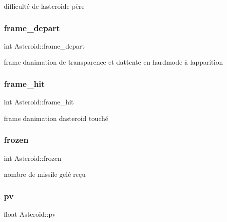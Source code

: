 difficulté de l\textquotesingle{}asteroide père 

\mbox{\label{struct_asteroid_a2162b2408ddf727e63ce810920ae2660}} 
\subsubsection{\texorpdfstring{frame\+\_\+depart}{frame\_depart}}
{\footnotesize\ttfamily int Asteroid\+::frame\+\_\+depart}



frame d\textquotesingle{}animation de transparence et d\textquotesingle{}attente en hardmode à l\textquotesingle{}apparition 

\mbox{\label{struct_asteroid_a6ebfa25ce73be7413f016eb1df89e789}} 
\subsubsection{\texorpdfstring{frame\+\_\+hit}{frame\_hit}}
{\footnotesize\ttfamily int Asteroid\+::frame\+\_\+hit}



frame d\textquotesingle{}animation d\textquotesingle{}asteroid touché 

\mbox{\label{struct_asteroid_a3f7bec61c78234d5e4685787927ac563}} 
\subsubsection{\texorpdfstring{frozen}{frozen}}
{\footnotesize\ttfamily int Asteroid\+::frozen}



nombre de missile gelé reçu 

\mbox{\label{struct_asteroid_a3700f8d0c8cc68782f266635be742ca5}} 
\subsubsection{\texorpdfstring{pv}{pv}}
{\footnotesize\ttfamily float Asteroid\+::pv}




